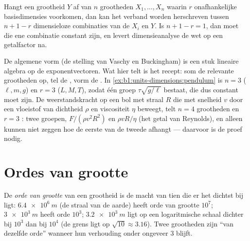\begin{proposition}\label{prop:b1:units-dimensions:pi}
Hangt een grootheid $Y$ af van $n$ grootheden $X_1, \dots, X_n$ waarin
$r$ onafhankelijke basisdimensies voorkomen, dan kan het verband worden
herschreven tussen $n + 1 - r$ dimensieloze combinaties van de $X_i$ en $Y$.
Is $n + 1 - r = 1$, dan moet die ene combinatie constant zijn, en levert
dimensieanalyse de wet op een getalfactor na.
\end{proposition}
\admitted

\begin{remark}\label{rem:b1:units-dimensions:pi}
De algemene vorm (de stelling van Vaschy en Buckingham) is een stuk lineaire
algebra op de exponentvectoren. Wat hier telt is het recept: som de relevante
grootheden op, tel de , vorm de . In
\cref{ex:b1:units-dimensions:pendulum} is $n = 3$
($\ell, m, g$) en $r = 3$ ($L, M, T$), zodat één groep
$\tau\sqrt{g/\ell}$ bestaat, die dus constant moet zijn. De weerstandskracht op
een bol met straal $R$ die met snelheid $v$ door een vloeistof van dichtheid
$\rho$ en viscositeit $\eta$ beweegt, telt $n = 4$ grootheden en $r = 3$
: twee groepen, $F/(\rho v^2 R^2)$ en $\rho v R/\eta$ (het getal van
Reynolds), en  alleen kunnen niet zeggen hoe de eerste van de tweede
afhangt --- daarvoor is de proef nodig.
\end{remark}

\section{Ordes van grootte}

\begin{definition}\label{def:b1:units-dimensions:oom}
De \emph{orde van grootte} van een grootheid is de macht van tien die er het
dichtst bij ligt: $\qty{6.4e6}{m}$ (de straal van de aarde) heeft orde van
grootte $10^7$; $\qty{3e3}{m}$ heeft orde $10^3$; $\qty{3.2e3}{m}$ ligt op
een logaritmische schaal dichter bij $10^3$ dan bij $10^4$ (de grens ligt op
$\sqrt{10} \approx 3.16$). Twee grootheden zijn ``van dezelfde orde'' wanneer
hun verhouding onder ongeveer $3$ blijft.
\end{definition}

